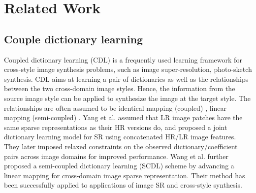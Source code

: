 \documentclass[10pt,twocolumn,letterpaper]{article}
\begin{document}
\section{Related Work}
\subsection{Couple dictionary learning}
Coupled dictionary learning (CDL) is a frequently used learning framework for cross-style image synthesis problems, such as image super-resolution, photo-sketch synthesis. CDL aims at learning a pair of dictionaries as well as the relationships between the two cross-domain image styles. Hence, the information from the source image style can be applied to synthesize the image at the target style. The relationships are often assumed to be identical mapping (coupled) \cite{yang2010image}, linear mapping (semi-coupled) \cite{wang2012semi}. Yang et al. \cite{yang2010image} assumed that LR image patches have the same sparse representations as their HR versions do, and proposed a joint dictionary learning model for SR using concatenated HR/LR image features. They later imposed relaxed constraints on the observed dictionary/coefficient pairs across image domains for improved performance. Wang et al. \cite{wang2012semi} further proposed a semi-coupled dictionary
learning (SCDL) scheme by advancing a linear mapping for cross-domain image sparse representation. Their method
has been successfully applied to applications of image SR and cross-style synthesis.
\end{document}
